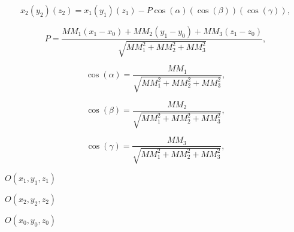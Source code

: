 \documentclass{article}
\begin{document}
\[ x_2 (y_2) (z_2) = x_1 (y_1) (z_1) - P \cos(\alpha) (\cos(\beta)) (\cos(\gamma)), \]
\pagebreak

\[ P = \frac{MM_1(x_1 - x_0) + MM_2(y_1 - y_0) + MM_3(z_1 - z_0)}{\sqrt{MM_1^2 + MM_2^2 + MM_3^2}}, \]
\pagebreak

\[ \cos(\alpha) = \frac{MM_1}{\sqrt{MM_1^2 + MM_2^2 + MM_3^2}}, \]
\pagebreak

\[ \cos(\beta) = \frac{MM_2}{\sqrt{MM_1^2 + MM_2^2 + MM_3^2}}, \]
\pagebreak

\[ \cos(\gamma) = \frac{MM_3}{\sqrt{MM_1^2 + MM_2^2 + MM_3^2}}, \]
\pagebreak

$O(x_1, y_1, z_1)$
\pagebreak

$O(x_2, y_2, z_2)$
\pagebreak

$ O(x_0, y_0, z_0)$
\pagebreak
\end{document}
